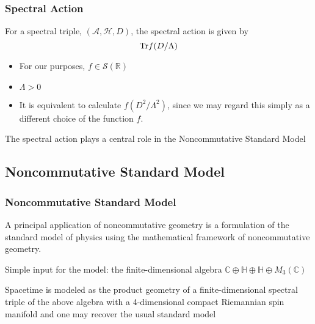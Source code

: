 \documentclass{beamer}
\def\C{{\mathbb C}}
\renewcommand{\H}{{\mathbb H}}
\def\R{{\mathbb R}}
\def\cA{{\mathcal A}}
\def\cH{{\mathcal H}}
\def\Tr{{\rm Tr}}
\begin{document}
\begin{frame}
	\frametitle{Spectral Action}

	\begin{block}{}
		For a spectral triple, $(\cA, \cH, D)$, the spectral action is given by
		\[
		\Tr f(D / \Lambda)
		\]
	\end{block}

	\pause

	\begin{itemize}
		\item For our purposes, $f \in \mathcal{S} (\R)$
		\item $\Lambda > 0$
		\item It is equivalent to calculate $f(D^2/ \Lambda ^2)$, since we may regard this simply as a different choice of the function $f$.
	\end{itemize}

	\pause

	\begin{block}{}
		The spectral action plays a central role in the Noncommutative Standard Model
	\end{block}

\end{frame}


\subsection{Noncommutative Standard Model}

\begin{frame}
	\frametitle{Noncommutative Standard Model}

	\begin{block}{}
		A principal application of noncommutative geometry is a formulation of the standard model of physics using the mathematical framework of noncommutative geometry.
	\end{block}

	\pause

	\begin{block}{}
		Simple input for the model: the finite-dimensional algebra $\C \oplus \H \oplus \H \oplus M_3(\C)$
	\end{block}

	\pause

	\begin{block}{}
		Spacetime is modeled as the product geometry of a finite-dimensional spectral triple of the above algebra with a 4-dimensional compact Riemannian spin manifold and one may recover the usual standard model
	\end{block}

\end{frame}
\end{document}
